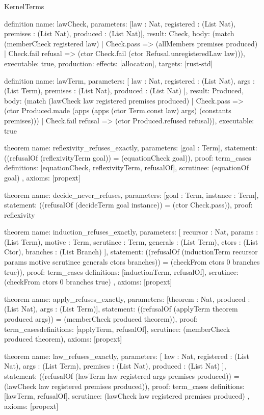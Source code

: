 \begin{lexlean}{KernelTerms}
\begin{semanticmodule}
definition{
  name: lawCheck,
  parameters: [law : Nat, registered : (List Nat), premises : (List Nat), produced : (List Nat)],
  result: Check,
  body: (match (memberCheck registered law)
    | Check.pass => (allMembers premises produced)
    | Check.fail refusal => (ctor Check.fail (ctor Refusal.unregisteredLaw law))),
  executable: true,
  production: {effects: [allocation], targets: [rust-std]}
}

definition{
  name: lawTerm,
  parameters: [
    law : Nat,
    registered : (List Nat),
    args : (List Term),
    premises : (List Nat),
    produced : (List Nat)
  ],
  result: Produced,
  body: (match (lawCheck law registered premises produced)
    | Check.pass => (ctor Produced.made (apps (apps (ctor Term.const law) args) (constants premises)))
    | Check.fail refusal => (ctor Produced.refused refusal)),
  executable: true
}

theorem{
  name: reflexivity_refuses_exactly,
  parameters: [goal : Term],
  statement: ((refusalOf (reflexivityTerm goal)) = (equationCheck goal)),
  proof: term_cases{
    definitions: [equationCheck, reflexivityTerm, refusalOf],
    scrutinee: (equationOf goal)
  },
  axioms: [propext]
}

theorem{
  name: decide_never_refuses,
  parameters: [goal : Term, instance : Term],
  statement: ((refusalOf (decideTerm goal instance)) = (ctor Check.pass)),
  proof: reflexivity{}
}

theorem{
  name: induction_refuses_exactly,
  parameters: [
    recursor : Nat,
    params : (List Term),
    motive : Term,
    scrutinee : Term,
    generals : (List Term),
    ctors : (List Ctor),
    branches : (List Branch)
  ],
  statement: ((refusalOf (inductionTerm recursor params motive scrutinee generals ctors branches)) = (checkFrom ctors 0 branches true)),
  proof: term_cases{
    definitions: [inductionTerm, refusalOf],
    scrutinee: (checkFrom ctors 0 branches true)
  },
  axioms: [propext]
}

theorem{
  name: apply_refuses_exactly,
  parameters: [theorem : Nat, produced : (List Nat), args : (List Term)],
  statement: ((refusalOf (applyTerm theorem produced args)) = (memberCheck produced theorem)),
  proof: term_cases{definitions: [applyTerm, refusalOf], scrutinee: (memberCheck produced theorem)},
  axioms: [propext]
}

theorem{
  name: law_refuses_exactly,
  parameters: [
    law : Nat,
    registered : (List Nat),
    args : (List Term),
    premises : (List Nat),
    produced : (List Nat)
  ],
  statement: ((refusalOf (lawTerm law registered args premises produced)) = (lawCheck law registered premises produced)),
  proof: term_cases{
    definitions: [lawTerm, refusalOf],
    scrutinee: (lawCheck law registered premises produced)
  },
  axioms: [propext]
}


\end{semanticmodule}
\end{lexlean}
